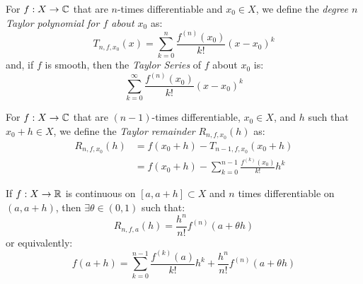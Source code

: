 \documentclass[../main.tex]{subfiles}
\begin{document}
\begin{definition}
  For $f: X \to \mathbb{C}$ that are $n$-times differentiable and $x_0 \in X$, we define the \textit{degree $n$ Taylor polynomial for $f$ about $x_0$} as: \label{taylorSeries}
  \[
    T_{n, f, x_0}(x) = \sum_{k = 0}^{n} \frac{f^{(n)}(x_0)}{k!}(x - x_0)^{k}
  \]
  and, if $f$ is smooth, then the \textit{Taylor Series} of $f$ about $x_0$ is:
  \[
    \sum_{k = 0}^{\infty} \frac{f^{(n)}(x_0)}{k!}(x - x_0)^{k}
  \]
\end{definition}
\begin{definition}
  For $f: X \to \mathbb{C}$ that are $(n - 1)$-times differentiable, $x_0 \in X$, and $h$ such that $x_0 + h \in X$, we define the \textit{Taylor remainder} $R_{n, f, x_0}(h)$ as: \label{taylorRemainder}
  \begin{align*}
    R_{n, f, x_0}(h) &= f(x_0 + h) - T_{n - 1, f, x_0}(x_0 + h) \\
                     &= f(x_0 + h) - \sum_{k = 0}^{n - 1} \frac{f^{(k)}(x_0)}{k!}h^{k}
  \end{align*}
\end{definition}
\begin{theorem}
  If $f: X \to \mathbb{R}$ is continuous on $[a, a + h] \subset X$ and $n$ times differentiable on $(a, a + h)$, then $\exists \theta \in (0, 1)$ such that:
  \label{lagrangeRemainder}
  \[
    R_{n, f, a}(h) = \frac{h^{n}}{n!}f^{(n)}(a + \theta h)
  \]
  or equivalently:
  \[
    f(a + h) = \sum_{k = 0}^{n - 1} \frac{f^{(k)}(a)}{k!}h^{k} + \frac{h^{n}}{n!}f^{(n)}(a + \theta h)
  \]
\end{theorem}
\end{document}
